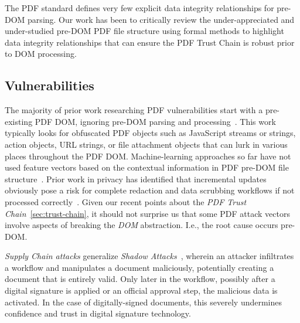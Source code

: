 The PDF standard defines very few explicit data integrity relationships for pre-DOM parsing. 
Our work has been to critically review the under-appreciated and under-studied pre-DOM PDF
file structure using formal methods to highlight data integrity relationships that can 
ensure the PDF Trust Chain is robust prior to DOM processing.

\subsection{Vulnerabilities}
\label{sec:vulnerabilities}


The majority of prior work researching PDF vulnerabilities start with a pre-existing PDF DOM,
ignoring pre-DOM parsing and processing~\cite{smutzMaliciousPDFDetection2012,liuDetectingMaliciousJavascript2014,iwamotoStudyMaliciousPDF2016}. 
This work typically looks for obfuscated PDF objects such as
JavaScript streams or strings, action objects, URL strings, or file attachment objects that 
can lurk in various places throughout the PDF DOM. Machine-learning approaches so far have not  
used feature vectors based on the contextual information in PDF pre-DOM file structure~\cite{andrewmangleAnalysisMachineLearning2021,manharmohammedHAPSSAHolisticApproach2021}. 
Prior work in privacy has identified that incremental updates obviously pose a risk for complete
redaction and data scrubbing workflows if not processed correctly~\cite{adhataraoHowArePDF2021,y.fengSystematicMethodPDF2018}.
Given our recent points about the \emph{PDF Trust Chain}~\cref{sec:trust-chain}, it should not 
surprise us that some PDF attack vectors involve aspects of breaking the \emph{DOM} abstraction.
I.e., the root cause occurs pre-DOM.

\emph{Supply Chain attacks} generalize \emph{Shadow
  Attacks}~\cite{mainkaShadowAttacksHiding2021}, wherein an attacker
infiltrates a workflow and manipulates a document maliciously,
potentially creating a document that is entirely valid.
%
Only later in the workflow, possibly after a digital signature is
applied or an official approval step, the malicious data is
activated.
%
In the case of digitally-signed documents, this severely undermines
confidence and trust in digital signature technology.

